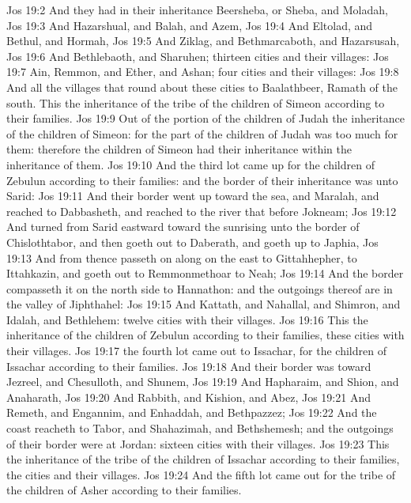 \vs Jos 19:2 And they had in their inheritance Beersheba, or Sheba, and Moladah,
\vs Jos 19:3 And Hazarshual, and Balah, and Azem,
\vs Jos 19:4 And Eltolad, and Bethul, and Hormah,
\vs Jos 19:5 And Ziklag, and Bethmarcaboth, and Hazarsusah,
\vs Jos 19:6 And Bethlebaoth, and Sharuhen; thirteen cities and their villages:
\vs Jos 19:7 Ain, Remmon, and Ether, and Ashan; four cities and their villages:
\vs Jos 19:8 And all the villages that  round about these cities to Baalathbeer, Ramath of the south. This  the inheritance of the tribe of the children of Simeon according to their families.
\vs Jos 19:9 Out of the portion of the children of Judah  the inheritance of the children of Simeon: for the part of the children of Judah was too much for them: therefore the children of Simeon had their inheritance within the inheritance of them.
\vs Jos 19:10 And the third lot came up for the children of Zebulun according to their families: and the border of their inheritance was unto Sarid:
\vs Jos 19:11 And their border went up toward the sea, and Maralah, and reached to Dabbasheth, and reached to the river that  before Jokneam;
\vs Jos 19:12 And turned from Sarid eastward toward the sunrising unto the border of Chislothtabor, and then goeth out to Daberath, and goeth up to Japhia,
\vs Jos 19:13 And from thence passeth on along on the east to Gittahhepher, to Ittahkazin, and goeth out to Remmonmethoar to Neah;
\vs Jos 19:14 And the border compasseth it on the north side to Hannathon: and the outgoings thereof are in the valley of Jiphthahel:
\vs Jos 19:15 And Kattath, and Nahallal, and Shimron, and Idalah, and Bethlehem: twelve cities with their villages.
\vs Jos 19:16 This  the inheritance of the children of Zebulun according to their families, these cities with their villages.
\vs Jos 19:17  the fourth lot came out to Issachar, for the children of Issachar according to their families.
\vs Jos 19:18 And their border was toward Jezreel, and Chesulloth, and Shunem,
\vs Jos 19:19 And Hapharaim, and Shion, and Anaharath,
\vs Jos 19:20 And Rabbith, and Kishion, and Abez,
\vs Jos 19:21 And Remeth, and Engannim, and Enhaddah, and Bethpazzez;
\vs Jos 19:22 And the coast reacheth to Tabor, and Shahazimah, and Bethshemesh; and the outgoings of their border were at Jordan: sixteen cities with their villages.
\vs Jos 19:23 This  the inheritance of the tribe of the children of Issachar according to their families, the cities and their villages.
\vs Jos 19:24 And the fifth lot came out for the tribe of the children of Asher according to their families.
